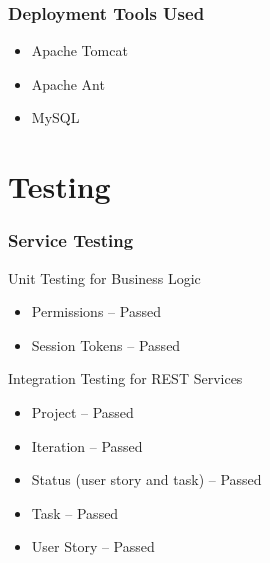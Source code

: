 \documentclass[final]{beamer}
\begin{document}
\begin{frame}
	\frametitle{Deployment Tools Used}
	\begin{beamerboxesrounded}[shadow]{}
		\begin{itemize}
			\item{Apache Tomcat}
			\item{Apache Ant}
			\item{MySQL}
		\end{itemize}
	\end{beamerboxesrounded}
\end{frame}


\section{Testing}

\begin{frame}
	\frametitle{Service Testing}
	\begin{beamerboxesrounded}[shadow]{Unit Testing for Business Logic}
		\begin{itemize}
			\item{Permissions -- Passed}
			\item{Session Tokens -- Passed}
		\end{itemize}
	\end{beamerboxesrounded}

	\begin{beamerboxesrounded}[shadow]{Integration Testing for REST Services}
		\begin{itemize}
			\item{Project -- Passed}
			\item{Iteration -- Passed}
			\item{Status (user story and task) -- Passed}
			\item{Task -- Passed}
			\item{User Story -- Passed}
		\end{itemize}
	\end{beamerboxesrounded}
\end{frame}

\end{document}
